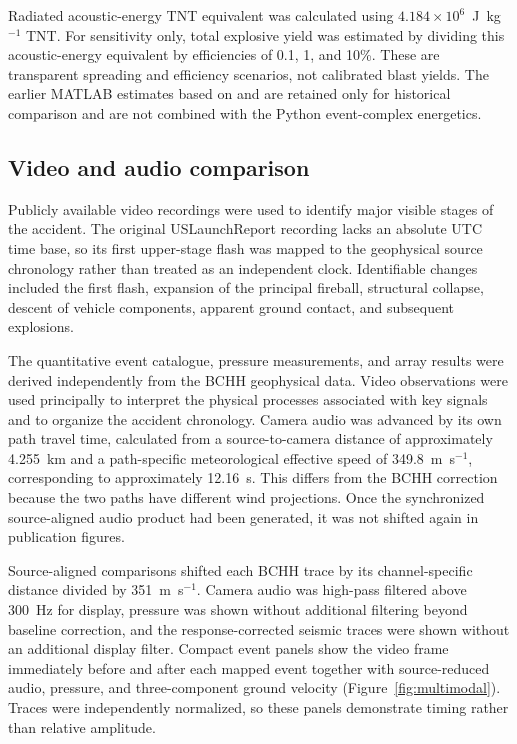 \documentclass[]{seismica}
\begin{document}
Radiated acoustic-energy TNT equivalent was calculated using
$4.184\times10^6$~J~kg$^{-1}$ TNT. For sensitivity only, total explosive yield
was estimated by dividing this acoustic-energy equivalent by efficiencies of
0.1, 1, and 10\%. These are transparent spreading and efficiency scenarios,
not calibrated blast yields. The earlier MATLAB estimates based on
\citet{johnson_aster_2005} and \citet{kanamori_1977} are retained only for
historical comparison and are not combined with the Python event-complex
energetics.

\subsection{Video and audio comparison}

Publicly available video recordings were used to identify major visible stages
of the accident. The original USLaunchReport recording
\citep{uslaunchreport_amos6_video_2016} lacks an absolute UTC time base, so
its first upper-stage flash was mapped to the geophysical source chronology
rather than treated as an independent clock. Identifiable changes included the
first flash, expansion of the principal fireball, structural collapse, descent
of vehicle components, apparent ground contact, and subsequent explosions.

The quantitative event catalogue, pressure measurements, and array results were
derived independently from the BCHH geophysical data. Video observations were
used principally to interpret the physical processes associated with key
signals and to organize the accident chronology. Camera audio was advanced by
its own path travel time, calculated from a source-to-camera distance of
approximately 4.255~km and a path-specific meteorological effective speed of
349.8~m~s$^{-1}$, corresponding to approximately 12.16~s. This differs from
the BCHH correction because the two paths have different wind projections.
Once the synchronized source-aligned audio product had been generated, it was
not shifted again in publication figures.

Source-aligned comparisons shifted each BCHH trace by its channel-specific
distance divided by 351~m~s$^{-1}$. Camera audio was high-pass filtered above
300~Hz for display, pressure was shown without additional filtering beyond
baseline correction, and the response-corrected seismic traces were shown
without an additional display filter.
Compact event panels show the video frame immediately before and after each
mapped event together with source-reduced audio, pressure, and three-component
ground velocity (Figure~\ref{fig:multimodal}). Traces were independently
normalized, so these panels demonstrate timing rather than relative amplitude.
\end{document}
